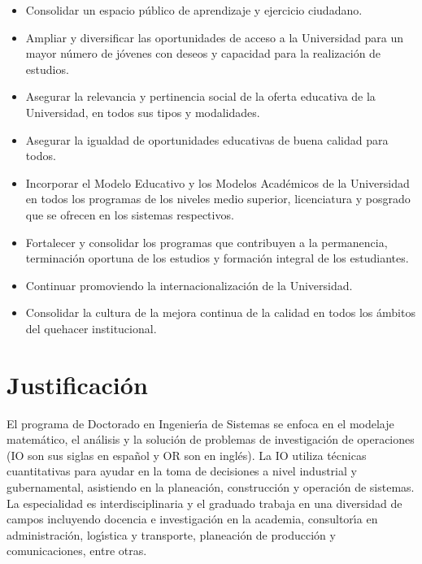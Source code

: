 \documentclass{article}
\begin{document}
\begin{itemize}
\item{Consolidar un espacio p\'{u}blico de aprendizaje y ejercicio
    ciudadano.}
\item{Ampliar y diversificar las oportunidades de acceso a la
    Universidad para un mayor n\'{u}mero de j\'{o}venes con deseos y capacidad
    para la realizaci\'{o}n de estudios.}
\item{Asegurar la relevancia y pertinencia social de la oferta
    educativa de la Universidad, en todos sus tipos y modalidades.}
\item{Asegurar la igualdad de oportunidades educativas de buena
    calidad para todos.}
\item{Incorporar el Modelo Educativo y los Modelos Acad\'{e}micos de la
    Universidad en todos los programas de los niveles medio superior,
    licenciatura y posgrado que se ofrecen en los sistemas
    respectivos.}
\item{Fortalecer y consolidar los programas que contribuyen a la
    permanencia, terminaci\'{o}n oportuna de los estudios y formaci\'{o}n
    integral de los estudiantes.}
\item{Continuar promoviendo la internacionalizaci\'{o}n de la Universidad.}
\item{Consolidar la cultura de la mejora continua de la calidad en
    todos los \'{a}mbitos del quehacer institucional.}
\end{itemize}

\section{Justificaci\'{o}n}

El programa de Doctorado en Ingenier\'{\i}a de Sistemas se enfoca en el
modelaje matem\'{a}tico, el an\'{a}lisis y la soluci\'{o}n de problemas de
investigaci\'{o}n de operaciones (IO son sus siglas en espa\~{n}ol y OR son en
ingl\'{e}s). La IO utiliza t\'{e}cnicas cuantitativas para ayudar en la toma
de decisiones a nivel industrial y gubernamental, asistiendo en la
planeaci\'{o}n, construcci\'{o}n y operaci\'{o}n de sistemas. La especialidad es
interdisciplinaria y el graduado trabaja en una diversidad de campos
incluyendo docencia e investigaci\'{o}n en la academia, consultor\'{\i}a en
administraci\'{o}n, log\'{\i}stica y transporte, planeaci\'{o}n de producci\'{o}n y
comunicaciones, entre otras.
\end{document}
